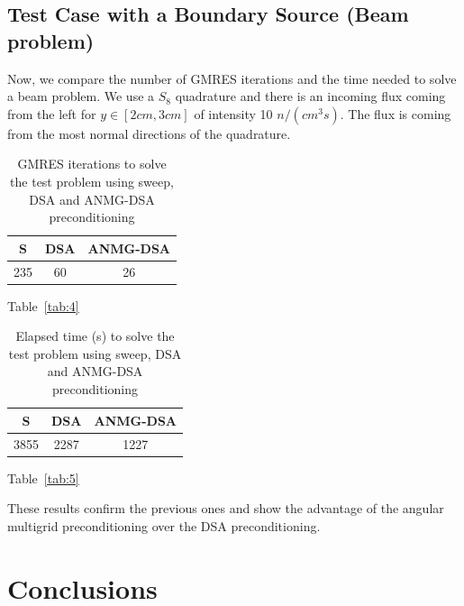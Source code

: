 \documentclass[preprint,10pt]{elsarticle}
\renewcommand{\(}{\left(}
\renewcommand{\)}{\right)}
\renewcommand{\[}{\left[}
\renewcommand{\]}{\right]}
\newcommand{\tbl}[1]{Table~\ref{#1}}                     %
\begin{document}
\subsection{Test Case with a Boundary Source (Beam problem)}

Now, we compare the number of GMRES iterations and the time needed to solve a
beam problem. We use a $S_8$ quadrature and there is an incoming flux coming
from the left for $y\in [2cm,3cm]$ of intensity 10 $n/(cm^3s)$. The flux is
coming from the most normal directions of the quadrature.
\begin{table}[H]
\begin{center}
\begin{tabular}{|c|c|c|}
\hline
S & DSA & ANMG-DSA\\
\hline
235 & 60 & 26 \\
\hline
\end{tabular}
\caption{GMRES iterations to solve the test problem using sweep, DSA and
ANMG-DSA preconditioning}
\tbl{tab:4}
\end{center}
\end{table}

\begin{table}[H]
\begin{center}
\begin{tabular}{|c|c|c|}
\hline
S & DSA & ANMG-DSA\\
\hline
3855 & 2287 & 1227\\
\hline
\end{tabular}
\caption{Elapsed time (s) to solve the test problem using sweep, DSA and
ANMG-DSA preconditioning}
\tbl{tab:5}
\end{center}
\end{table}
%
These results confirm the previous ones and show the advantage of the angular
multigrid preconditioning over the DSA preconditioning.

\section{Conclusions} \label{sec:conclusions}
\end{document}
